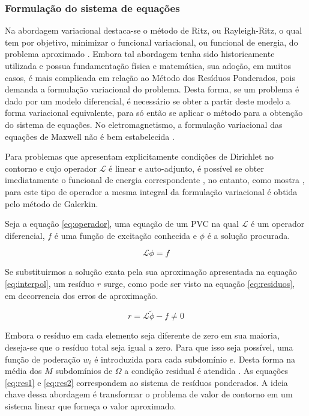 \documentclass[
    12pt,               %
    openright,          %
    oneside,
    a4paper,            %
    english,            %
    french,             %
    spanish,            %
    brazil              %
    ]{abntex2}
\begin{document}
\subsubsection*{Formulação do sistema de equações}
Na abordagem variacional destaca-se o método de Ritz, ou Rayleigh-Ritz, o qual tem por objetivo, minimizar o funcional variacional, ou funcional de energia, do problema aproximado \cite{volakis}. Embora tal abordagem tenha sido historicamente utilizada e possua fundamentação física e matemática, sua adoção, em muitos casos, é mais complicada em relação ao Método dos Resíduos Ponderados, pois demanda a formulação variacional do problema. Desta forma, se um problema é dado por um modelo diferencial, é necessário se obter a partir deste modelo a forma variacional equivalente, para só então se aplicar o método para a obtenção do sistema de equações. No eletromagnetismo, a formulação variacional das equações de Maxwell não é bem estabelecida \cite{jin}.

Para problemas que apresentam explicitamente condições de Dirichlet no contorno e cujo operador $\mathcal{L}$ é linear e auto-adjunto, é possível se obter imediatamente o funcional de energia correspondente \cite{zien}, no entanto, como mostra \cite[p. 29]{volakis}, para este tipo de operador a mesma integral da formulação variacional é obtida pelo método de Galerkin.


Seja a equação \ref{eq:operador}, uma equação de um PVC na qual $\mathcal{L}$ é um operador diferencial, $f$ é uma função de excitação conhecida e $\phi$ é a solução procurada.

\begin{equation}
\label{eq:operador}
\mathcal{L} \phi = f
\end{equation}

Se substituirmos a solução exata pela sua aproximação apresentada na equação \ref{eq:interpol}, um resíduo $r$ surge, como pode ser visto na equação \ref{eq:residuos}, em decorrencia dos erros de aproximação.

\begin{equation}
\label{eq:residuos}
r = \mathcal{L} \tilde{\phi} - f \neq 0
\end{equation}

Embora o resíduo em cada elemento seja diferente de zero em sua maioria, deseja-se que o resíduo total seja igual a zero. Para que isso seja possível, uma função de poderação $w_i$ é introduzida para cada subdomínio $e$. Desta forma na média dos $M$ subdomínios de $\Omega$ a condição residual é atendida \cite{volakis}.
As equações \ref{eq:res1} e \ref{eq:res2} correspondem ao sistema de resíduos ponderados. A ideia chave dessa abordagem é transformar o problema de valor de contorno em um sistema linear que forneça o valor aproximado. 
\end{document}
